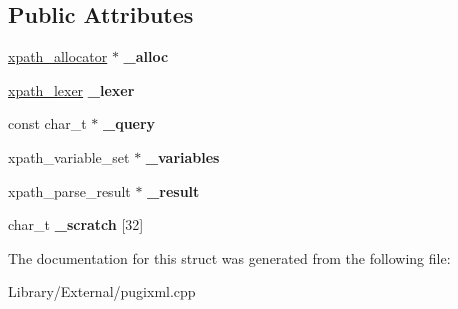 \subsection*{Public Attributes}
\begin{DoxyCompactItemize}
\item 
\hypertarget{structxpath__parser_ac34f5b21ef406bec944286eee2f45836}{}\hyperlink{classxpath__allocator}{xpath\+\_\+allocator} $\ast$ {\bfseries \+\_\+alloc}\label{structxpath__parser_ac34f5b21ef406bec944286eee2f45836}

\item 
\hypertarget{structxpath__parser_a50106db584946e67acd080ef5391a0f4}{}\hyperlink{classxpath__lexer}{xpath\+\_\+lexer} {\bfseries \+\_\+lexer}\label{structxpath__parser_a50106db584946e67acd080ef5391a0f4}

\item 
\hypertarget{structxpath__parser_aaf5ea5d5be97cdd93adc7a719d8edc1c}{}const char\+\_\+t $\ast$ {\bfseries \+\_\+query}\label{structxpath__parser_aaf5ea5d5be97cdd93adc7a719d8edc1c}

\item 
\hypertarget{structxpath__parser_a3e0adfea7cc81c08b97ee1375831df6c}{}xpath\+\_\+variable\+\_\+set $\ast$ {\bfseries \+\_\+variables}\label{structxpath__parser_a3e0adfea7cc81c08b97ee1375831df6c}

\item 
\hypertarget{structxpath__parser_a9370fb875bfc49ca6e35f3165ecb1692}{}xpath\+\_\+parse\+\_\+result $\ast$ {\bfseries \+\_\+result}\label{structxpath__parser_a9370fb875bfc49ca6e35f3165ecb1692}

\item 
\hypertarget{structxpath__parser_aa9180a17c8ec28977928c815c3425a79}{}char\+\_\+t {\bfseries \+\_\+scratch} \mbox{[}32\mbox{]}\label{structxpath__parser_aa9180a17c8ec28977928c815c3425a79}

\end{DoxyCompactItemize}


The documentation for this struct was generated from the following file\+:\begin{DoxyCompactItemize}
\item 
Library/\+External/pugixml.\+cpp\end{DoxyCompactItemize}
